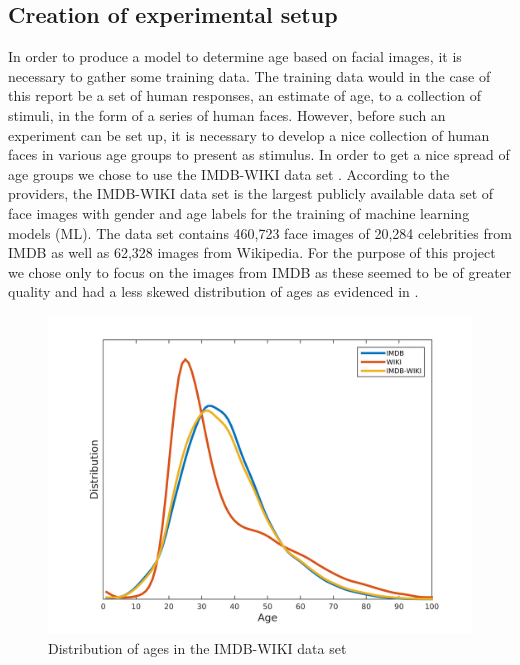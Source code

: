 

\subsection{Creation of experimental setup}
In order to produce a model to determine age based on facial images, it is necessary to gather some training data. The training data would in the case of this report be a set of human responses, an estimate of age, to a collection of stimuli, in the form of a series of human faces. However, before such an experiment can be set up, it is necessary to develop a nice collection of human faces in various age groups to present as stimulus. In order to get a nice spread of age groups we chose to use the IMDB-WIKI data set \cite{IMDB15,IMDB16}. According to the providers, the IMDB-WIKI data set is the largest publicly available data set of face images with gender and age labels for the training of machine learning models (ML). The data set contains 460,723 face images of 20,284 celebrities from IMDB as well as 62,328 images from Wikipedia. For the purpose of this project we chose only to focus on the images from IMDB as these seemed to be of greater quality and had a less skewed distribution of ages as evidenced in .

\begin{figure}[ht]
    \centering
    \includegraphics[width = 0.9\linewidth]{fig/age_dist.png}
    \caption{Distribution of ages in the IMDB-WIKI data set}
    \label{fig:age_dist}
\end{figure}

